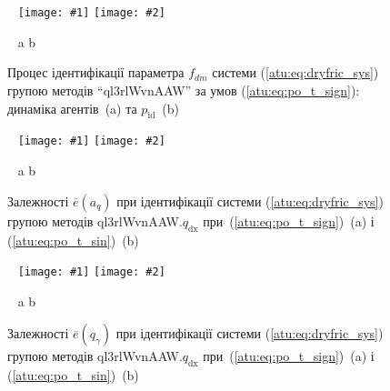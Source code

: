 \documentclass[14pt,handout,utf8]{beamer}
\newcommand{\ABlbl}{%
  \vspace{-2.9ex}
  \begin{center}
    ~ \hfill a \hfill\hfill b \hfill ~
  \end{center}
  \vspace{-2.0ex}
}
\newcommand{\PicDouble}[2]{%
 \begin{center}
    ~ \hfill
    \texttt{[image: \#1]}
    \hfill
    \texttt{[image: \#2]}
    \hfill ~
  \end{center}
  \ABlbl
}
\begin{document}
\begin{frame}
  \frametitle{~}

  \begin{figure}[htb!]
    \PicDouble{../p5/p/cha/fric/ql3rlWvnAAW/fric_id-p_t_pi_ql3rlWvnAAW_sign.png}{../p5/p/cha/fric/ql3rlWvnAAW/fric_id-p_t_p_ql3rlWvnAAW_sign.png}
    \caption{
      Процес ідентифікації параметра $f_{dm}$ системи (\ref{atu:eq:dryfric_sys}) групою методів ``ql3rlWvnAAW''
      за умов (\ref{atu:eq:po_t_sign}): динаміка агентів~(a) та $p_\mathrm{id}$~(b)
    }
    \label{atu:f:fric_id_ql3rlWvnAAW_q_dx_sign}
  \end{figure}

  \vspace{-2ex}

  \begin{figure}[htb!]
    \PicDouble{../p5/p/cha/fric/ql3rlWvnAAW/fric_id-p_a_q_sign.png}{../p5/p/cha/fric/ql3rlWvnAAW/fric_id-p_a_q_sin.png}
    \caption{Залежності $\overline{e}(a_q)$ при ідентифікації системи (\ref{atu:eq:dryfric_sys}) групою методів ql3rlWvnAAW.$q_\mathrm{dx} $ при~(\ref{atu:eq:po_t_sign})~(a) і (\ref{atu:eq:po_t_sin})~(b)}
    \label{atu:f:fric_a_q_ql3rlWvnAAW_q_dx}
  \end{figure}

  \vspace{-2ex}

  \begin{figure}[htb!]
    \PicDouble{../p5/p/cha/fric/ql3rlWvnAAW/fric_id-p_q_gamma_sign.png}{../p5/p/cha/fric/ql3rlWvnAAW/fric_id-p_q_gamma_sin.png}
    \caption{Залежності $\overline{e}(q_\gamma)$ при ідентифікації системи (\ref{atu:eq:dryfric_sys}) групою методів ql3rlWvnAAW.$q_\mathrm{dx} $ при~(\ref{atu:eq:po_t_sign})~(a) і (\ref{atu:eq:po_t_sin})~(b)}
    \label{atu:f:fric_q_gamma_ql3rlWvnAAW_q_dx}
  \end{figure}


\end{frame}





\end{document}
